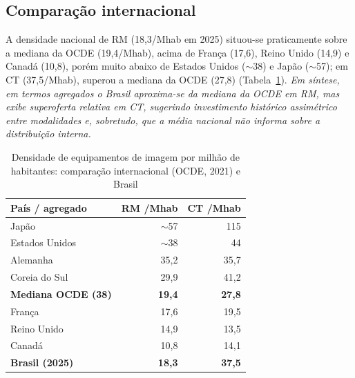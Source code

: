 \documentclass[12pt,a4paper,oneside]{article}
\begin{document}
\subsection{Comparação internacional}

A densidade nacional de RM (18,3/Mhab em 2025) situou-se praticamente
sobre a mediana da OCDE (19,4/Mhab), acima de França (17,6), Reino
Unido (14,9) e Canadá (10,8), porém muito abaixo de Estados Unidos
($\sim$38) e Japão ($\sim$57); em CT (37,5/Mhab), superou a mediana da
OCDE (27,8) (Tabela~\ref{tab:internacional}). \textit{Em síntese, em
termos agregados o Brasil aproxima-se da mediana da OCDE em RM, mas
exibe superoferta relativa em CT, sugerindo investimento histórico
assimétrico entre modalidades \textemdash{} e, sobretudo, que a média
nacional não informa sobre a distribuição interna.}

\begin{table}[htbp]
\centering
\caption{Densidade de equipamentos de imagem por milhão de habitantes:
comparação internacional (OCDE, 2021) e Brasil}
\begin{tabular}{lrr}
\toprule
\textbf{País / agregado} & \textbf{RM /Mhab} & \textbf{CT /Mhab} \\
\midrule
Japão                          & $\sim$57 & 115  \\
Estados Unidos                 & $\sim$38 & 44   \\
Alemanha                       & 35,2     & 35,7 \\
Coreia do Sul                  & 29,9     & 41,2 \\
\textbf{Mediana OCDE (38)}     & \textbf{19,4} & \textbf{27,8} \\
França                         & 17,6     & 19,5 \\
Reino Unido                    & 14,9     & 13,5 \\
Canadá                         & 10,8     & 14,1 \\
\midrule
\textbf{Brasil (2025)}         & \textbf{18,3} & \textbf{37,5} \\
\bottomrule
\end{tabular}
\par{}
\label{tab:internacional}
\end{table}
\end{document}
